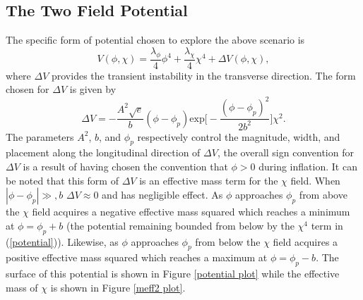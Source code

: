 \documentclass[letterpaper,11pt]{article}
\begin{document}
\subsection{The Two Field Potential}
The specific form of potential chosen to explore the above scenario is
\begin{equation}
V(\phi, \chi) = \frac{\lambda_{\phi}}{4}\phi^4 + \frac{\lambda_{\chi}}{4}\chi^4 + \Delta V(\phi, \chi), \label{potential}
\end{equation}
where $\Delta V$ provides the transient instability in the transverse direction. The form chosen for $\Delta V$ is given by
\begin{equation}
\Delta V = -\frac{A^2\sqrt{e}}{b}(\phi - \phi_p)\mathrm{exp}\bigg[-\frac{(\phi-\phi_p)^2}{2b^2}\bigg]\chi^2. \label{dv}
\end{equation}
The parameters $A^2$, $b$, and $\phi_p$ respectively control the magnitude, width, and placement along the longitudinal direction of $\Delta V$, the overall sign convention for $\Delta V$ is a result of having chosen the convention that $\phi>0$ during inflation. It can be noted that this form of $\Delta V$ is an effective mass term for the $\chi$ field. When $|\phi-\phi_p| \gg, b$ $\Delta V \approx 0$ and has negligible effect. As $\phi$ approaches $\phi_p$ from above the $\chi$ field acquires a negative effective mass squared which reaches a minimum at $\phi = \phi_p + b$ (the potential remaining bounded from below by the $\chi^4$ term in (\ref{potential})). Likewise, as $\phi$ approaches $\phi_p$ from below the $\chi$ field acquires a positive effective mass squared which reaches a maximum at $\phi = \phi_p - b$. The surface of this potential is shown in Figure \ref{potential plot} while the effective mass of $\chi$ is shown in Figure \ref{meff2 plot}.
\end{document}
